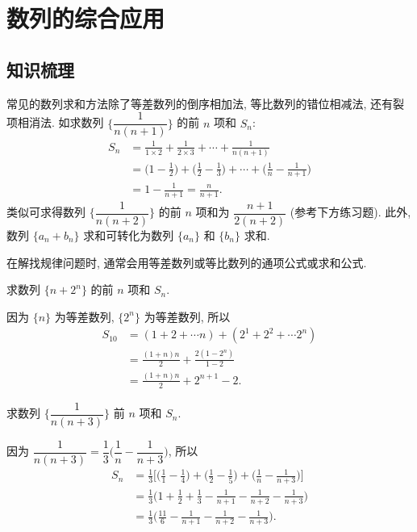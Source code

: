 
\section{数列的综合应用}

\subsection{知识梳理}
常见的数列求和方法除了等差数列的倒序相加法, 等比数列的错位相减法, 还有裂项相消法. 如求数列 $\Big\{\dfrac1{n(n+1)}\Big\}$ 的前 $n$ 项和 $S_n$:
\begin{align*}
    S_n
    &= \frac1{1\times2}+\frac1{2\times3}+\cdots+\frac1{n(n+1)} \\
    &= \Big(1-\frac12\Big)+\Big(\frac12-\frac13\Big)+\cdots
       +\Big(\frac1{n}-\frac1{n+1}\Big)                    \\
    &= 1-\frac1{n+1}
     = \frac{n}{n+1}.
\end{align*}
类似可求得数列 $\Big\{\dfrac1{n(n+2)}\Big\}$ 的前 $n$ 项和为 $\dfrac{n+1}{2(n+2)}$ (参考下方练习题). 此外, 数列 $\{a_n+b_n\}$ 求和可转化为数列 $\{a_n\}$ 和 $\{b_n\}$ 求和.

在解找规律问题时, 通常会用等差数列或等比数列的通项公式或求和公式.

\lianxi
\begin{exercise}
    求数列 $\{n+2^n\}$ 的前 $n$ 项和 $S_{n}$.
\end{exercise}
\beginsolution
    因为 $\{n\}$ 为等差数列, $\{2^n\}$ 为等差数列, 所以
    \[\begin{aligned}
        S_{10}
        &= (1+2+\cdots n)+ (2^1+2^2+\cdots 2^n)\\
        &= \frac{(1+n)n}{2}+ \frac{2(1-2^n)}{1-2}\\
        &= \frac{(1+n)n}{2}+ 2^{n+1}-2.
    \end{aligned}\]
\endsolution

\begin{exercise}
    求数列 $\Big\{\dfrac1{n(n+3)}\Big\}$ 前 $n$ 项和 $S_n$.
\end{exercise}
\beginsolution
    因为 $\dfrac1{n(n+3)}= \dfrac13\biggl(\dfrac1n- \dfrac1{n+3}\biggr)$, 所以
    \[\begin{aligned}
        S_n
        &= \frac13\biggl[\biggl(\frac11-\frac14\biggr)
            +\biggl(\frac12-\frac15\biggr)
            +\biggl(\frac1{n}-\frac1{n+3}\biggr)\biggr]\\
        &= \frac13\biggl(1+\frac12+\frac13- \frac1{n+1}
            - \frac1{n+2}- \frac1{n+3}\biggr)\\
        &= \frac13\biggl(\frac{11}6- \frac1{n+1}
            - \frac1{n+2}- \frac1{n+3}\biggr).
    \end{aligned}\]
\endsolution

